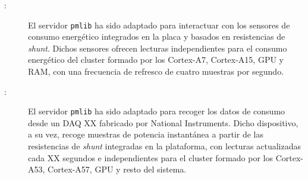 \begin{description}

\item[\odroid:] El servidor {\tt pmlib} ha sido adaptado para interactuar con los sensores de consumo energético integrados 
en la placa y basados en resistencias de {\em shunt}. Dichos sensores ofrecen lecturas independientes para el consumo energético
del cluster formado por los Cortex-A7, Cortex-A15, GPU y RAM, con una frecuencia de refresco de cuatro muestras por segundo.

\item[\juno:] El servidor {\tt pmlib} ha sido adaptado para recoger los datos de consumo desde un DAQ XX fabricado por National
Instruments. Dicho dispositivo, a su vez, recoge muestras de potencia instantánea a partir de las resistencias de {\em shunt}
integradas en la plataforma, con lecturas actualizadas cada XX segundos e independientes para el cluster formado por los 
Cortex-A53, Cortex-A57, GPU y resto del sistema.

\end{description}

